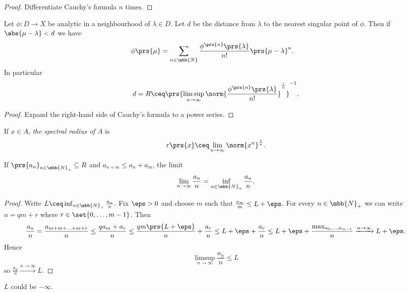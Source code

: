 \documentclass[10pt, twoside]{book}
\begin{document}
\begin{proof}
Differentiate Cauchy's formula $n$ times.
\end{proof}

\begin{corollary}
Let $\phi \colon D \to X$ be analytic in a neighbourhood of $\lambda \in D$. Let $d$ be the distance from $\lambda$ to the nearest singular point of $\phi$. Then if $\abs{\mu - \lambda} < d$ we have
\begin{align*}
\phi\prs{\mu} &= \sum_{n \in \mbb{N}} \frac{\phi^{\prs{n}} \prs{\lambda}}{n!} \prs{\mu - \lambda}^n \text{.}
\end{align*}
In particular
\[d = R \ceq \prs{\limsup_{n\to\infty} \norm{\frac{\phi^{\prs{n}}\prs{\lambda}}{n!}}^{\frac{1}{n}}}^{-1} \text{.}\]
\end{corollary}

\begin{proof}
Expand the right-hand side of Cauchy's formula to a power series.
\end{proof}

\begin{definition}
If $x \in A$, \emph{the spectral radius of $A$} is \[r\prs{x} \ceq \lim_{n\to\infty} \norm{x^n}^{\frac{1}{n}} \text{.}\]
\end{definition}

\begin{lemma}
If $\prs{a_n}_{n \in \mbb{N}_+} \subseteq R$ and $a_{n+m} \leq a_n + a_m$, the limit
\[\lim_{n\to\infty} \frac{a_n}{n} = \inf_{n \in \mbb{N}_+} \frac{a_n}{n} \text{.}\]
\end{lemma}

\begin{proof}
Write $L \ceq \inf_{n\in\mbb{N}_+} \frac{a_n}{n}$. Fix $\eps > 0$ and choose $m$ such that $\frac{a_m}{m} \leq L+\eps$. For every $n \in \mbb{N}_+$ we can write $n = qm + r$ where $r \in \set{0,\ldots, m-1}$. Then \[\frac{a_n}{n} = \frac{a_{m+m+\ldots + m + r}}{n} \leq \frac{q a_m + a_r}{n} \leq \frac{q m\prs{L+\eps}}{n} + \frac{a_r}{n} \leq L + \eps + \frac{a_r}{n} \leq L + \eps + \frac{\max_{a_0, \ldots, a_{m-1}}}{n} \xrightarrow{n\to\infty} L + \eps \text{.}\]
Hence
\[\limsup_{n\to\infty} \frac{a_n}{n} \leq L\]
so $\frac{a_n}{n} \xrightarrow{n\to\infty} L$.
\end{proof}

\begin{remark}
$L$ could be $-\infty$.
\end{remark}
\end{document}
